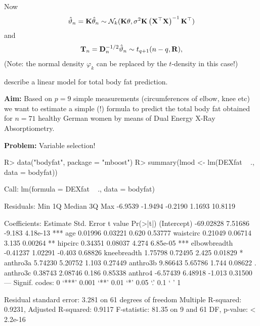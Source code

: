 \documentclass[landscape]{slides}
\begin{document}
Now
\begin{eqnarray*}
\hat{\vartheta}_n = \K \hat{\theta}_n \sim \N_k(\K \theta, \sigma^2 \K \left(\X^\top\X%
\right)^{-1} \K^\top)
\end{eqnarray*}
and
\begin{eqnarray*}
\mathbf{T}_n = \mathbf{D}_n^{-1/2} \hat{\vartheta}_n \sim t_{q+1}(n - q, \mathbf{R}),
\end{eqnarray*}
(Note: the normal density $\varphi_k$ can be replaced by the
$t$-density in this case!)


\cite{garcia2005} describe a linear model
for total body fat prediction.

\textbf{Aim:} Based on $p = 9$ simple measurements (circumferences of elbow, knee etc)
we want to estimate a simple (!) formula to predict the total body fat obtained for
$n = 71$ healthy German women by means of Dual Energy X-Ray Absorptiometry. 

\textbf{Problem:} Variable selection!


\begin{Schunk}
\begin{Sinput}
R> data("bodyfat", package = "mboost")
R> summary(lmod <- lm(DEXfat ~ ., data = bodyfat))
\end{Sinput}
\begin{Soutput}
Call:
lm(formula = DEXfat ~ ., data = bodyfat)

Residuals:
    Min      1Q  Median      3Q     Max 
-6.9539 -1.9494 -0.2190  1.1693 10.8119 

Coefficients:
              Estimate Std. Error t value Pr(>|t|)    
(Intercept)  -69.02828    7.51686  -9.183 4.18e-13 ***
age            0.01996    0.03221   0.620  0.53777    
waistcirc      0.21049    0.06714   3.135  0.00264 ** 
hipcirc        0.34351    0.08037   4.274 6.85e-05 ***
elbowbreadth  -0.41237    1.02291  -0.403  0.68826    
kneebreadth    1.75798    0.72495   2.425  0.01829 *  
anthro3a       5.74230    5.20752   1.103  0.27449    
anthro3b       9.86643    5.65786   1.744  0.08622 .  
anthro3c       0.38743    2.08746   0.186  0.85338    
anthro4       -6.57439    6.48918  -1.013  0.31500    
---
Signif. codes:  0 ‘***’ 0.001 ‘**’ 0.01 ‘*’ 0.05 ‘.’ 0.1 ‘ ’ 1 

Residual standard error: 3.281 on 61 degrees of freedom
Multiple R-squared: 0.9231,	Adjusted R-squared: 0.9117 
F-statistic: 81.35 on 9 and 61 DF,  p-value: < 2.2e-16 
\end{Soutput}
\end{Schunk}
\end{document}
